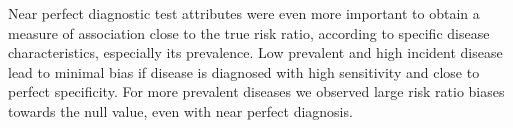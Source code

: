 Near perfect diagnostic test attributes were even more important to obtain a
measure of association close to the true risk ratio, according to specific
disease characteristics, especially its prevalence.
Low prevalent and high incident disease lead to minimal bias if disease is
diagnosed with high sensitivity and close to perfect specificity.
For more prevalent diseases we observed large risk ratio biases towards the
null value, even with near perfect diagnosis.
  
